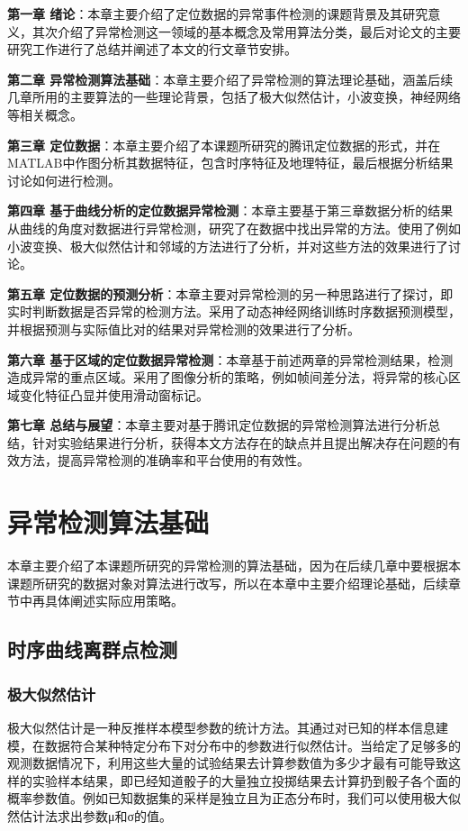 \documentclass[a4paper,AutoFakeBold,oneside,12pt]{book}
\begin{document}
\begin{description}
\item \textbf{第一章 绪论}：本章主要介绍了定位数据的异常事件检测的课题背景及其研究意义，其次介绍了异常检测这一领域的基本概念及常用算法分类，最后对论文的主要研究工作进行了总结并阐述了本文的行文章节安排。
\item \textbf{第二章 异常检测算法基础}：本章主要介绍了异常检测的算法理论基础，涵盖后续几章所用的主要算法的一些理论背景，包括了极大似然估计，小波变换，神经网络等相关概念。
\item \textbf{第三章 定位数据}：本章主要介绍了本课题所研究的腾讯定位数据的形式，并在MATLAB中作图分析其数据特征，包含时序特征及地理特征，最后根据分析结果讨论如何进行检测。
\item \textbf{第四章 基于曲线分析的定位数据异常检测}：本章主要基于第三章数据分析的结果从曲线的角度对数据进行异常检测，研究了在数据中找出异常的方法。使用了例如小波变换、极大似然估计和邻域的方法进行了分析，并对这些方法的效果进行了讨论。
\item \textbf{第五章 定位数据的预测分析}：本章主要对异常检测的另一种思路进行了探讨，即实时判断数据是否异常的检测方法。采用了动态神经网络训练时序数据预测模型，并根据预测与实际值比对的结果对异常检测的效果进行了分析。
\item \textbf{第六章 基于区域的定位数据异常检测}：本章基于前述两章的异常检测结果，检测造成异常的重点区域。采用了图像分析的策略，例如帧间差分法，将异常的核心区域变化特征凸显并使用滑动窗标记。
\item \textbf{第七章 总结与展望}：本章主要对基于腾讯定位数据的异常检测算法进行分析总结，针对实验结果进行分析，获得本文方法存在的缺点并且提出解决存在问题的有效方法，提高异常检测的准确率和平台使用的有效性。
\end{description}


\chapter{异常检测算法基础}
本章主要介绍了本课题所研究的异常检测的算法基础，因为在后续几章中要根据本课题所研究的数据对象对算法进行改写，所以在本章中主要介绍理论基础，后续章节中再具体阐述实际应用策略。


\section{时序曲线离群点检测}
\subsection{极大似然估计}
	极大似然估计是一种反推样本模型参数的统计方法。其通过对已知的样本信息建模，在数据符合某种特定分布下对分布中的参数进行似然估计。当给定了足够多的观测数据情况下，利用这些大量的试验结果去计算参数值为多少才最有可能导致这样的实验样本结果，即已经知道骰子的大量独立投掷结果去计算扔到骰子各个面的概率参数值。例如已知数据集的采样是独立且为正态分布时，我们可以使用极大似然估计法求出参数μ和σ的值。
\end{document}
